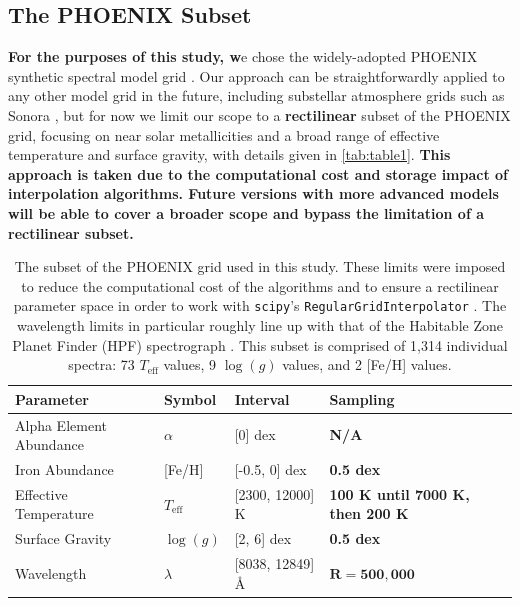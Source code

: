 \documentclass[twocolumn, linenumbers]{aastex631}
\begin{document}
\subsection{The PHOENIX Subset}
\textbf{For the purposes of this study, w}e chose the widely-adopted PHOENIX synthetic spectral model grid \citep{PHOENIX}.
Our approach can be straightforwardly applied to any other model grid in the future, including substellar atmosphere grids such as Sonora \citep{bobcat, cholla, diamondback, elfowl}, but for now we limit our scope to a \textbf{rectilinear} subset of the PHOENIX grid, focusing on near solar metallicities and a broad range of effective temperature and surface gravity, with details given in \autoref{tab:table1}.
\textbf{This approach is taken due to the computational cost and storage impact of interpolation algorithms.
Future versions with more advanced models will be able to cover a broader scope and bypass the limitation of a rectilinear subset.}

\begin{table}
    \hspace*{0.6cm}\begin{tabular}{llll}
        \hline
        \bf{Parameter} & \bf{Symbol} & \bf{Interval} & \bf{Sampling}\\
        \hline
        Alpha Element Abundance & $\alpha$ & [0] dex & \bf{N/A}\\
        Iron Abundance & [Fe/H] & [-0.5, 0] dex & \bf{0.5 dex}\\
        Effective Temperature & $T_{\mathrm{eff}}$ & [2300, 12000] K & \bf{100 K until 7000 K, then 200 K}\\
        Surface Gravity & $\log(g)$ & [2, 6] dex & \bf{0.5 dex} \\
        Wavelength & $\lambda$ & [8038, 12849] \AA & $\mathbf{R = 500,000}$\\
        \hline
    \end{tabular}
    \caption{The subset of the PHOENIX grid used in this study.
    These limits were imposed to reduce the computational cost of the algorithms and to ensure a rectilinear parameter space in order to work with \texttt{scipy}'s \texttt{RegularGridInterpolator} \citep{scipy}.
    The wavelength limits in particular roughly line up with that of the Habitable Zone Planet Finder (HPF) spectrograph \citep{HPF}.
    This subset is comprised of 1,314 individual spectra: 73 $T_{\mathrm{eff}}$ values, 9 $\log(g)$ values, and 2 [Fe/H] values.}
    \label{tab:table1}
\end{table}
\end{document}
